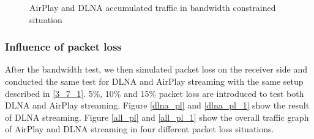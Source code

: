 \begin{figure}[hb]%
\caption{AirPlay and DLNA accumulated traffic in
bandwidth constrained situation\label{all_traffic_bw_1}}
\end{figure}
\clearpage
\subsubsection{Influence of packet loss\label{4_1_3}}
After the bandwidth test, we then simulated packet loss on the receiver side and
conducted the same test for DLNA and AirPlay streaming with the same setup
described in \ref{3_7_1}. 5\%, 10\% and 15\% packet loss are introduced to test
both DLNA and AirPlay streaming. Figure \ref{dlna_pl} and \ref{dlna_pl_1} show
the result of DLNA streaming. Figure \ref{all_pl} and \ref{all_pl_1} show the
overall traffic graph of AirPlay and DLNA streaming in four different packet
loss situations.

